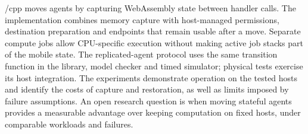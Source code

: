 
\paglets{}/cpp moves agents by capturing WebAssembly state between
handler calls. The implementation combines memory capture with
host-managed permissions, destination preparation and endpoints that
remain usable after a move. Separate compute jobs allow CPU-specific
execution without making active job stacks part of the mobile state.
The replicated-agent protocol uses the same transition function in the
library, model checker and timed simulator; physical tests exercise its
host integration. The experiments demonstrate operation on the tested
hosts and identify the costs of capture and restoration, as well as
limits imposed by failure assumptions. An open research question is
when moving stateful agents provides a measurable advantage over keeping
computation on fixed hosts, under comparable workloads and failures.
